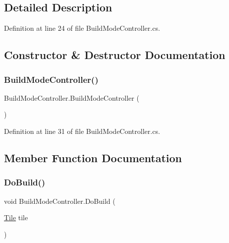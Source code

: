 \subsection{Detailed Description}


Definition at line 24 of file Build\+Mode\+Controller.\+cs.



\subsection{Constructor \& Destructor Documentation}
\mbox{\label{class_build_mode_controller_aebdab45886f7d5596c93615e35b7ffa4}} 
\subsubsection{\texorpdfstring{Build\+Mode\+Controller()}{BuildModeController()}}
{\footnotesize\ttfamily Build\+Mode\+Controller.\+Build\+Mode\+Controller (\begin{DoxyParamCaption}{ }\end{DoxyParamCaption})}



Definition at line 31 of file Build\+Mode\+Controller.\+cs.



\subsection{Member Function Documentation}
\mbox{\label{class_build_mode_controller_acc5df17b8a7f94448334cf7e5a414b5b}} 
\subsubsection{\texorpdfstring{Do\+Build()}{DoBuild()}}
{\footnotesize\ttfamily void Build\+Mode\+Controller.\+Do\+Build (\begin{DoxyParamCaption}\item[{\hyperlink{class_tile}{Tile}}]{tile }\end{DoxyParamCaption})}



